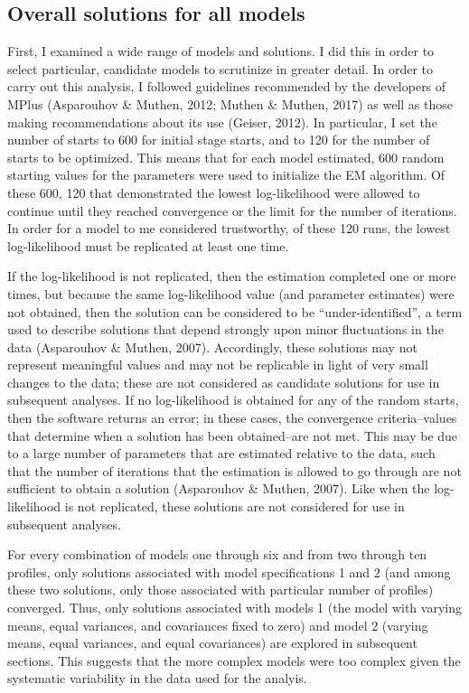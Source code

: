 \documentclass[]{book}
\theoremstyle{definition}
\theoremstyle{definition}
\theoremstyle{definition}
\theoremstyle{remark}
\begin{document}
\subsection{Overall solutions for all
models}\label{overall-solutions-for-all-models}

First, I examined a wide range of models and solutions. I did this in
order to select particular, candidate models to scrutinize in greater
detail. In order to carry out this analysis, I followed guidelines
recommended by the developers of MPlus (Asparouhov \& Muthen, 2012;
Muthen \& Muthen, 2017) as well as those making recommendations about
its use (Geiser, 2012). In particular, I set the number of starts to 600
for initial stage starts, and to 120 for the number of starts to be
optimized. This means that for each model estimated, 600 random starting
values for the parameters were used to initialize the EM algorithm. Of
these 600, 120 that demonstrated the lowest log-likelihood were allowed
to continue until they reached convergence or the limit for the number
of iterations. In order for a model to me considered trustworthy, of
these 120 runs, the lowest log-likelihood must be replicated at least
one time.

If the log-likelihood is not replicated, then the estimation completed
one or more times, but because the same log-likelihood value (and
parameter estimates) were not obtained, then the solution can be
considered to be ``under-identified'', a term used to describe solutions
that depend strongly upon minor fluctuations in the data (Asparouhov \&
Muthen, 2007). Accordingly, these solutions may not represent meaningful
values and may not be replicable in light of very small changes to the
data; these are not considered as candidate solutions for use in
subsequent analyses. If no log-likelihood is obtained for any of the
random starts, then the software returns an error; in these cases, the
convergence criteria--values that determine when a solution has been
obtained--are not met. This may be due to a large number of parameters
that are estimated relative to the data, such that the number of
iterations that the estimation is allowed to go through are not
sufficient to obtain a solution (Asparouhov \& Muthen, 2007). Like when
the log-likelihood is not replicated, these solutions are not considered
for use in subsequent analyses.

For every combination of models one through six and from two through ten
profiles, only solutions associated with model specifications 1 and 2
(and among these two solutions, only those associated with particular
number of profiles) converged. Thus, only solutions associated with
models 1 (the model with varying means, equal variances, and covariances
fixed to zero) and model 2 (varying means, equal variances, and equal
covariances) are explored in subsequent sections. This suggests that the
more complex models were too complex given the systematic variability in
the data used for the analyis.
\end{document}
